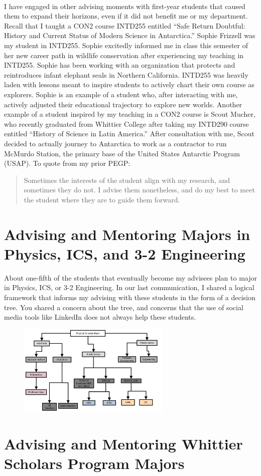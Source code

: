 \documentclass[../../main.tex]{subfiles}
\begin{document}
\\
\vspace{0.25cm}
I have engaged in other advising moments with first-year students that caused them to expand their horizons, even if it did not benefit me or my department.  Recall that I taught a CON2 course INTD255 entitled ``Safe Return Doubtful: History and Current Status of Modern Science in Antarctica.''  Sophie Frizzell was my student in INTD255.  Sophie excitedly informed me in class this semester of her new career path in wildlife conservation after experiencing my teaching in INTD255.  Sophie has been working with an organization that protects and reintroduces infant elephant seals in Northern California.  INTD255 was heavily laden with lessons meant to inspire students to actively chart their own course as explorers.  Sophie is an example of a student who, after interacting with me, actively adjusted their educational trajectory to explore new worlds.  Another example of a student inspired by my teaching in a CON2 course is Scout Mucher, who recently graduated from Whittier College after taking my INTD290 course entitled ``History of Science in Latin America.''  After consultation with me, Scout decided to actually journey to Antarctica to work as a contractor to run McMurdo Station, the primary base of the United States Antarctic Program (USAP).  To quote from my prior PEGP:

\begin{quotation}
Sometimes the interests of the student align with my research, and sometimes they do not. I advise them nonetheless, and do my best to meet the student where they are to guide them forward.
\end{quotation}

\section{Advising and Mentoring Majors in Physics, ICS, and 3-2 Engineering}

About one-fifth of the students that eventually become my advisees plan to major in Physics, ICS, or 3-2 Engineering.  In our last communication, I shared a logical framework that informs my advising with these students in the form of a decision tree.  You shared a concern about the tree, and concerns that the use of social media tools like LinkedIn does not always help these students.

\begin{figure}[hb]
\centering
\includegraphics[width=0.65\textwidth]{figures/tree.pdf}
\caption{\label{fig:tree}}
\end{figure}

\section{Advising and Mentoring Whittier Scholars Program Majors}
\end{document}
